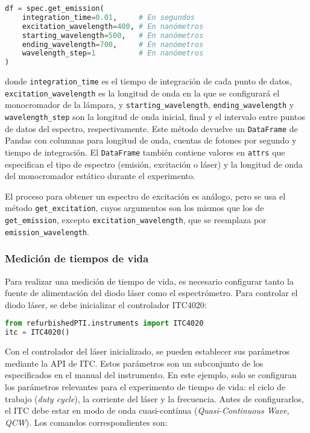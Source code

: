 \begin{lstlisting}[language=Python]
df = spec.get_emission(
    integration_time=0.01,     # En segundos
    excitation_wavelength=400, # En nanómetros
    starting_wavelength=500,   # En nanómetros
    ending_wavelength=700,     # En nanómetros
    wavelength_step=1          # En nanómetros
)
\end{lstlisting}

\noindent donde \texttt{integration\_time} es el tiempo de integración de cada punto de datos, \texttt{excitation\_wavelength} es la longitud de onda en la que se configurará el monocromador de la lámpara, y \texttt{starting\_wavelength}, \texttt{ending\_wavelength} y \texttt{wavelength\_step} son la longitud de onda inicial, final y el intervalo entre puntos de datos del espectro, respectivamente. Este método devuelve un \texttt{DataFrame} de Pandas con columnas para longitud de onda, cuentas de fotones por segundo y tiempo de integración. El \texttt{DataFrame} también contiene valores en \texttt{attrs} que especifican el tipo de espectro (emisión, excitación o láser) y la longitud de onda del monocromador estático durante el experimento. 

El proceso para obtener un espectro de excitación es análogo, pero se usa el método \texttt{get\_excitation}, cuyos argumentos son los mismos que los de \texttt{get\_emission}, excepto \texttt{excitation\_wavelength}, que se reemplaza por \texttt{emission\_wavelength}.

\subsubsection{Medición de tiempos de vida}

Para realizar una medición de tiempo de vida, es necesario configurar tanto la fuente de alimentación del diodo láser como el espectrómetro. Para controlar el diodo láser, se debe inicializar el controlador ITC4020:

\begin{lstlisting}[language=Python]
from refurbishedPTI.instruments import ITC4020
itc = ITC4020()
\end{lstlisting}

\noindent Con el controlador del láser inicializado, se pueden establecer sus parámetros mediante la API de ITC. Estos parámetros son un subconjunto de los especificados en el manual del instrumento. En este ejemplo, solo se configuran los parámetros relevantes para el experimento de tiempo de vida: el ciclo de trabajo (\textit{duty cycle}), la corriente del láser y la frecuencia. Antes de configurarlos, el ITC debe estar en modo de onda cuasi-contínua (\textit{Quasi-Continuous Wave, QCW}). Los comandos correspondientes son:

